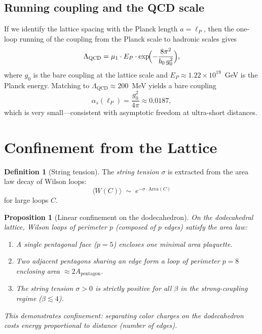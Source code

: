 \documentclass[12pt,a4paper]{article}
\newtheorem{proposition}[theorem]{Proposition}
\theoremstyle{definition}
\newtheorem{definition}[theorem]{Definition}
\theoremstyle{remark}
\begin{document}
\subsection{Running coupling and the QCD scale}\label{ssec:running}

If we identify the lattice spacing with the Planck length
$a = \ell_P$, then the one-loop running of the coupling from the
Planck scale to hadronic scales gives
\begin{equation}\label{eq:running}
  \Lambda_{\mathrm{QCD}} = \mu_1 \cdot E_P \cdot
  \exp\!\Bigl(-\frac{8\pi^2}{b_0\, g_0^2}\Bigr),
\end{equation}
where $g_0$ is the bare coupling at the lattice scale and
$E_P \approx 1.22 \times 10^{19}$~GeV is the Planck energy.
Matching to $\Lambda_{\mathrm{QCD}} \approx 200$~MeV
yields a bare coupling
\[
  \alpha_s(\ell_P) = \frac{g_0^2}{4\pi} \approx 0.0187,
\]
which is very small---consistent with asymptotic freedom at ultra-short
distances.

\section{Confinement from the Lattice}\label{sec:confinement}

\begin{definition}[String tension]\label{def:stringtension}
The \emph{string tension} $\sigma$ is extracted from the area law decay
of Wilson loops:
\[
  \langle W(C) \rangle \;\sim\; e^{-\sigma \cdot \mathrm{Area}(C)}
\]
for large loops $C$.
\end{definition}

\begin{proposition}[Linear confinement on the dodecahedron]\label{prop:confine}
On the dodecahedral lattice, Wilson loops of perimeter $p$ (composed of
$p$ edges) satisfy the area law:
\begin{enumerate}[label=\textup{(\alph*)}]
  \item A single pentagonal face ($p = 5$) encloses one minimal area
        plaquette.
  \item Two adjacent pentagons sharing an edge form a loop of perimeter
        $p = 8$ enclosing area $\approx 2A_{\text{pentagon}}$.
  \item The string tension $\sigma > 0$ is strictly positive for all
        $\beta$ in the strong-coupling regime ($\beta \lesssim 4$).
\end{enumerate}
This demonstrates confinement: separating color charges on the
dodecahedron costs energy proportional to distance (number of edges).
\end{proposition}
\end{document}

